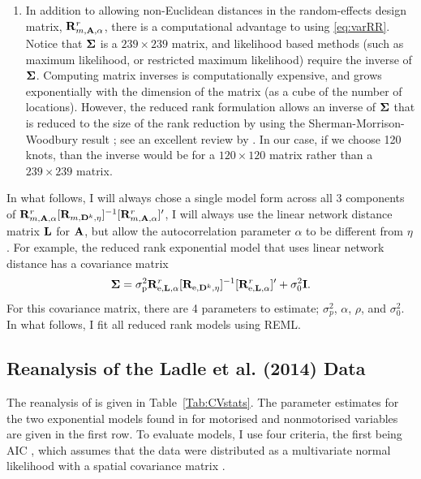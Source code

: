 \documentclass[11pt, titlepage]{article}\usepackage[]{graphicx}\usepackage[]{color}
\begin{document}
\begin{spacing}{1.9}
\begin{flushleft}
\begin{enumerate}
		\item In addition to allowing non-Euclidean distances in the random-effects design matrix, $\mathbf{R}^r_{m,\mathbf{A},\alpha}$, there is a computational advantage to using \ref{eq:varRR}.  Notice that $\mbox{\boldmath $\Sigma$}$ is a $239 \times 239$ matrix, and likelihood based methods (such as maximum likelihood, or restricted maximum likelihood) require the inverse of $\mbox{\boldmath $\Sigma$}$.  Computing matrix inverses is computationally expensive, and grows exponentially with the dimension of the matrix (as a cube of the number of locations).  However, the reduced rank formulation allows an inverse of $\mbox{\boldmath $\Sigma$}$ that is reduced to the size of the rank reduction by using the Sherman-Morrison-Woodbury result \citep{Sher:Morr:adju:1949,Wood:inve:1950}; see an excellent review by \citet{Hend:Sear:on:1981}. In our case, if we choose 120 knots, than the inverse would be for a $120 \times 120$ matrix rather than a $239 \times 239$ matrix.
\end{enumerate}

In what follows, I will always chose a single model form across all 3 components of $\mathbf{R}^r_{m,\mathbf{A},\alpha}[\mathbf{R}_{m,\mathbf{D}^k,\eta}]^{-1}[\mathbf{R}^r_{m,\mathbf{A},\alpha}]^{\prime}$, I will always use the linear network distance matrix $\mathbf{L}$ for $\mathbf{A}$, but allow the autocorrelation parameter $\alpha$ to be different from $\eta$.  For example, the reduced rank exponential model that uses linear network distance has a covariance matrix
\begin{equation} \label{eq:RRmodCov}
				\mbox{\boldmath $\Sigma$} = \sigma^2_\textrm{p}\mathbf{R}^r_{\textrm{e},\mathbf{L},\alpha}[\mathbf{R}_{\textrm{e},\mathbf{D}^k,\eta}]^{-1}[\mathbf{R}^r_{\textrm{e},\mathbf{L},\alpha}]^{\prime} + \sigma^2_0\mathbf{I}.
\end{equation}
For this covariance matrix, there are 4 parameters to estimate; $\sigma^2_p$, $\alpha$, $\rho$, and $\sigma^2_0$.  In what follows, I fit all reduced rank models using REML.

\subsection*{Reanalysis of the Ladle et al. (2014) Data}

The reanalysis of \citet{Ladl:Avga:Whea:Boyc:pred:2016} is given in Table~\ref{Tab:CVstats}.  The parameter estimates for the two exponential models found in \citet{Ladl:Avga:Whea:Boyc:pred:2016} for motorised and nonmotorised variables are given in the first row.  To evaluate models, I use four criteria, the first being AIC \citep{Akai:Info:1973,Burn:Ande:mode:2002}, which assumes that the data were distributed as a multivariate normal likelihood with a spatial covariance matrix \citep[for an example using spatial models, see][]{Hoet:Davi:Mert:Thom:mode:2006}.   


\end{flushleft}
\end{spacing}
\end{document}
